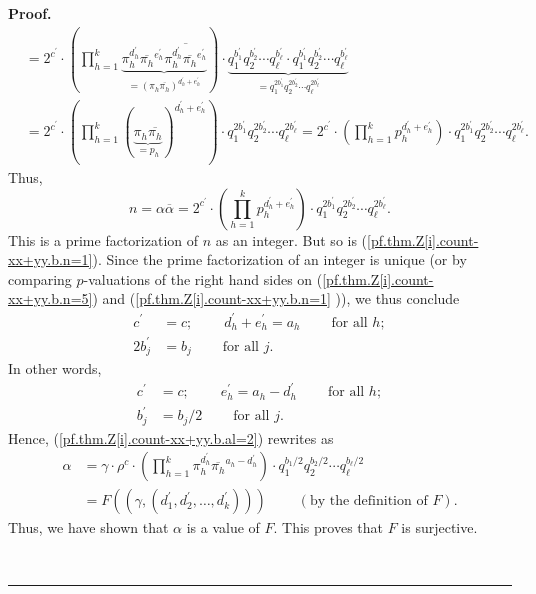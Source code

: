 \documentclass[numbers=enddot,12pt,final,onecolumn,notitlepage]{scrartcl}%
\numberwithin{exer}{subsection}
\theoremstyle{definition}
\newenvironment{proof}[1][Proof]{\noindent\textbf{#1.} }{\ \rule{0.5em}{0.5em}}
\let\prodnonlimits\prod
\renewcommand{\prod}{\prodnonlimits\limits}
\begin{document}
\begin{proof}
\begin{align*}
&  =2^{c^{\prime}}\cdot\left(  \prod_{h=1}^{k}\underbrace{\pi_{h}%
^{d_{h}^{\prime}}\overline{\pi_{h}}^{e_{h}^{\prime}}\overline{\pi_{h}%
^{d_{h}^{\prime}}\overline{\pi_{h}}^{e_{h}^{\prime}}}}_{=\left(  \pi
_{h}\overline{\pi_{h}}\right)  ^{d_{h}^{\prime}+e_{h}^{\prime}}}\right)
\cdot\underbrace{q_{1}^{b_{1}^{\prime}}q_{2}^{b_{2}^{\prime}}\cdots q_{\ell
}^{b_{\ell}^{\prime}}\cdot q_{1}^{b_{1}^{\prime}}q_{2}^{b_{2}^{\prime}}\cdots
q_{\ell}^{b_{\ell}^{\prime}}}_{=q_{1}^{2b_{1}^{\prime}}q_{2}^{2b_{2}^{\prime}%
}\cdots q_{\ell}^{2b_{\ell}^{\prime}}}\\
&  =2^{c^{\prime}}\cdot\left(  \prod_{h=1}^{k}\left(  \underbrace{\pi
_{h}\overline{\pi_{h}}}_{=p_{h}}\right)  ^{d_{h}^{\prime}+e_{h}^{\prime}%
}\right)  \cdot q_{1}^{2b_{1}^{\prime}}q_{2}^{2b_{2}^{\prime}}\cdots q_{\ell
}^{2b_{\ell}^{\prime}}=2^{c^{\prime}}\cdot\left(  \prod_{h=1}^{k}p_{h}%
^{d_{h}^{\prime}+e_{h}^{\prime}}\right)  \cdot q_{1}^{2b_{1}^{\prime}}%
q_{2}^{2b_{2}^{\prime}}\cdots q_{\ell}^{2b_{\ell}^{\prime}}.
\end{align*}
Thus,%
\begin{equation}
n=\alpha\overline{\alpha}=2^{c^{\prime}}\cdot\left(  \prod_{h=1}^{k}%
p_{h}^{d_{h}^{\prime}+e_{h}^{\prime}}\right)  \cdot q_{1}^{2b_{1}^{\prime}%
}q_{2}^{2b_{2}^{\prime}}\cdots q_{\ell}^{2b_{\ell}^{\prime}}.
\label{pf.thm.Z[i].count-xx+yy.b.n=5}%
\end{equation}
This is a prime factorization of $n$ as an integer. But so is
(\ref{pf.thm.Z[i].count-xx+yy.b.n=1}). Since the prime factorization of an
integer is unique (or by comparing $p$-valuations of the right hand sides on
(\ref{pf.thm.Z[i].count-xx+yy.b.n=5}) and (\ref{pf.thm.Z[i].count-xx+yy.b.n=1}%
)), we thus conclude%
\begin{align*}
c^{\prime}  &  =c;\ \ \ \ \ \ \ \ \ \ d_{h}^{\prime}+e_{h}^{\prime}%
=a_{h}\ \ \ \ \ \ \ \ \ \ \text{for all }h;\\
2b_{j}^{\prime}  &  =b_{j}\ \ \ \ \ \ \ \ \ \ \text{for all }j.
\end{align*}
In other words,%
\begin{align*}
c^{\prime}  &  =c;\ \ \ \ \ \ \ \ \ \ e_{h}^{\prime}=a_{h}-d_{h}^{\prime
}\ \ \ \ \ \ \ \ \ \ \text{for all }h;\\
b_{j}^{\prime}  &  =b_{j}/2\ \ \ \ \ \ \ \ \ \ \text{for all }j.
\end{align*}
Hence, (\ref{pf.thm.Z[i].count-xx+yy.b.al=2}) rewrites as%
\begin{align*}
\alpha &  =\gamma\cdot\rho^{c}\cdot\left(  \prod_{h=1}^{k}\pi_{h}%
^{d_{h}^{\prime}}\overline{\pi_{h}}^{a_{h}-d_{h}^{\prime}}\right)  \cdot
q_{1}^{b_{1}/2}q_{2}^{b_{2}/2}\cdots q_{\ell}^{b_{\ell}/2}\\
&  =F\left(  \left(  \gamma,\left(  d_{1}^{\prime},d_{2}^{\prime},\ldots
,d_{k}^{\prime}\right)  \right)  \right)  \ \ \ \ \ \ \ \ \ \ \left(  \text{by
the definition of }F\right)  .
\end{align*}
Thus, we have shown that $\alpha$ is a value of $F$. This proves that $F$ is surjective.


\end{proof}
\end{document}
